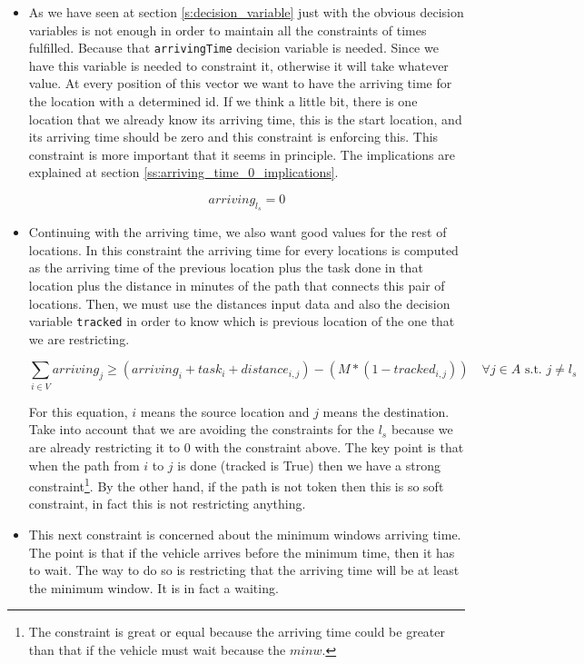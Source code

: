 \documentclass[]{report}
\begin{document}
\begin{itemize}
	\item As we have seen at section \ref{s:decision_variable} just with the obvious decision variables is not enough in order to maintain all the constraints of times fulfilled. Because that {\tt arrivingTime} decision variable is needed. Since we have this variable is needed to constraint it, otherwise it will take whatever value. At every position of this vector we want to have the arriving time for the location with a determined id. If we think a little bit, there is one location that we already know its arriving time, this is the start location, and its arriving time should be zero and this constraint is enforcing this. This constraint is more important that it seems in principle. The implications are explained at section \ref{ss:arriving_time_0_implications}.
	
	$$ arriving_{l_{s}} = 0 $$

	\item Continuing with the arriving time, we also want good values for the rest of locations. In this constraint the arriving time for every locations is computed as the arriving time of the previous location plus the task done in that location plus the distance in minutes of the path that connects this pair of locations. Then, we must use the distances input data and also the decision variable {\tt tracked} in order to know which is previous location of the one that we are restricting.
	
	$$ \sum\limits_{i \in V} arriving_{j} \geq (arriving_i + task_i + distance_{i, j}) - (M*(1-tracked_{i, j})) \quad \forall j \in A \text{ s.t. } j \neq l_{s}$$
		
	For this equation, $i$ means the source location and $j$ means the destination. Take into account that we are avoiding the constraints for the $l_{s}$ because we are already restricting it to $0$ with the constraint above.
	The key point is that when the path from $i$ to $j$ is done (tracked is True) then we have a strong constraint\footnote{The constraint is great or equal because the arriving time could be greater than that if the vehicle must wait because the $minw$.}. By the other hand, if the path is not token then this is so soft constraint, in fact this is not restricting anything.
	
	\item This next constraint is concerned about the minimum windows arriving time. The point is that if the vehicle arrives before the minimum time, then it has to wait. The way to do so is restricting that the arriving time will be at least the minimum window. It is in fact a waiting.
	

\end{itemize}
\end{document}
